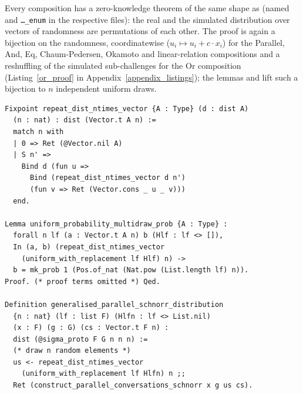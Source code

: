 \documentclass[sigconf,anonymous,review]{acmart}
\begin{document}
Every composition has a zero-knowledge theorem of the same shape as \texttt{} (named \texttt{} and \texttt{\ldots\_enum} in the respective files): the real and the simulated distribution over vectors of randomness are permutations of each other. The proof is again a bijection on the randomness, coordinatewise ($u_i \mapsto u_i + c \cdot x_i$) for the Parallel, And, Eq, Chaum-Pedersen, Okamoto and linear-relation compositions and a reshuffling of the simulated sub-challenges for the Or composition (Listing~\ref{or_proof} in Appendix~\ref{appendix_listings}); the lemmas \texttt{} and \texttt{} lift such a bijection to $n$ independent uniform draws.

\begin{lstlisting}[frame=single, language=Coq, caption={Composition of a Distribution},
label={dist_comp},captionpos=t, basicstyle=\ttfamily\footnotesize,
abovecaptionskip=-\medskipamount]
Fixpoint repeat_dist_ntimes_vector {A : Type} (d : dist A) 
  (n : nat) : dist (Vector.t A n) := 
  match n with 
  | 0 => Ret (@Vector.nil A)
  | S n' => 
    Bind d (fun u => 
      Bind (repeat_dist_ntimes_vector d n')
      (fun v => Ret (Vector.cons _ u _ v)))
  end.

Lemma uniform_probability_multidraw_prob {A : Type} :
  forall n lf (a : Vector.t A n) b (Hlf : lf <> []), 
  In (a, b) (repeat_dist_ntimes_vector 
    (uniform_with_replacement lf Hlf) n) ->
  b = mk_prob 1 (Pos.of_nat (Nat.pow (List.length lf) n)).
Proof. (* proof terms omitted *) Qed.

Definition generalised_parallel_schnorr_distribution  
  {n : nat} (lf : list F) (Hlfn : lf <> List.nil) 
  (x : F) (g : G) (cs : Vector.t F n) : 
  dist (@sigma_proto F G n n n) :=
  (* draw n random elements *)
  us <- repeat_dist_ntimes_vector 
    (uniform_with_replacement lf Hlfn) n ;;
  Ret (construct_parallel_conversations_schnorr x g us cs).
\end{lstlisting}
\end{document}
